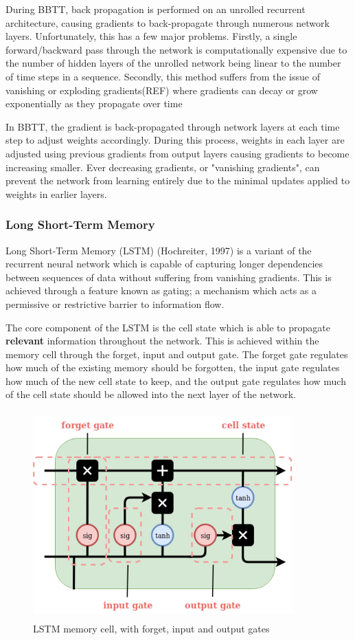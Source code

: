 \par
\noindent
\newline
During BBTT, back propagation is performed on an unrolled recurrent architecture, causing gradients to back-propagate through numerous network layers. Unfortunately, this has a few major problems. Firstly, a single forward/backward pass through the network is computationally expensive due to the number of hidden layers of the unrolled network being linear to the number of time steps in a sequence. Secondly, this method suffers from the issue of vanishing or exploding gradients(REF) where gradients can decay or grow exponentially as they propagate over time


In BBTT, the gradient is back-propagated through network layers at each time step to adjust weights accordingly. During this process, weights in each layer are adjusted using previous gradients from output layers causing gradients to become increasing smaller. Ever decreasing gradients, or "vanishing gradients", can prevent the network from learning entirely due to the minimal updates applied to weights in earlier layers.

\subsubsection{Long Short-Term Memory}
Long Short-Term Memory (LSTM) (Hochreiter, 1997) is a variant of the recurrent neural network which is capable of capturing longer dependencies between sequences of data without suffering from vanishing gradients. This is achieved through a feature known as gating; a mechanism which acts as a permissive or restrictive barrier to information flow. 

\noindent
\newline
The core component of the LSTM is the cell state which is able to propagate \textbf{relevant} information throughout the network. This is achieved within the memory cell through the forget, input and output gate. The forget gate regulates how much of the existing memory should be forgotten, the input gate regulates how much of the new cell state to keep, and the output gate regulates how much of the cell state should be allowed into the next layer of the network.

\begin{figure}[h]
	\includegraphics[width=10cm, height=8cm]{./figures/fig4}
	\centering
	\caption{LSTM memory cell, with forget, input and output gates}
	\label{fig:fig3}
\end{figure}

